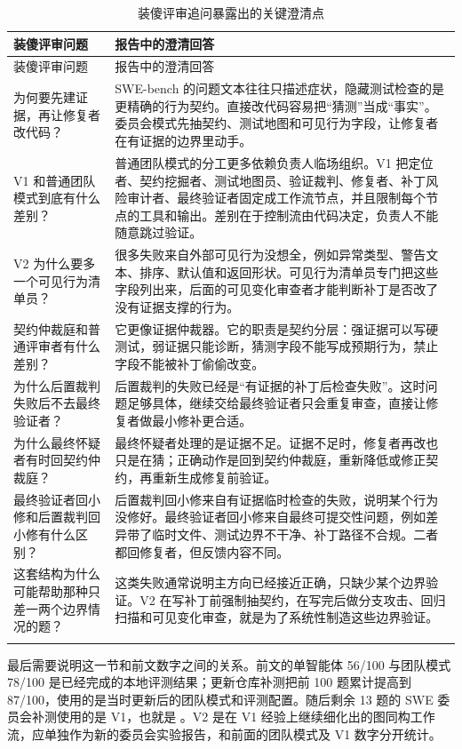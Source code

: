 \documentclass[UTF8,a4paper,11pt]{ctexart}
\begin{document}
\begin{center}
{\small
\setlength{\tabcolsep}{3pt}
\begin{longtable}{L{4.2cm} L{10.1cm}}
\toprule
装傻评审问题 & 报告中的澄清回答 \\
\midrule
\endfirsthead
\toprule
装傻评审问题 & 报告中的澄清回答 \\
\midrule
\endhead
为何要先建证据，再让修复者改代码？ & SWE-bench 的问题文本往往只描述症状，隐藏测试检查的是更精确的行为契约。直接改代码容易把“猜测”当成“事实”。委员会模式先抽契约、测试地图和可见行为字段，让修复者在有证据的边界里动手。 \\
V1 和普通团队模式到底有什么差别？ & 普通团队模式的分工更多依赖负责人临场组织。V1 把定位者、契约挖掘者、测试地图员、验证裁判、修复者、补丁风险审计者、最终验证者固定成工作流节点，并且限制每个节点的工具和输出。差别在于控制流由代码决定，负责人不能随意跳过验证。 \\
V2 为什么要多一个可见行为清单员？ & 很多失败来自外部可见行为没想全，例如异常类型、警告文本、排序、默认值和返回形状。可见行为清单员专门把这些字段列出来，后面的可见变化审查者才能判断补丁是否改了没有证据支撑的行为。 \\
契约仲裁庭和普通评审者有什么差别？ & 它更像证据仲裁器。它的职责是契约分层：强证据可以写硬测试，弱证据只能诊断，猜测字段不能写成预期行为，禁止字段不能被补丁偷偷改变。 \\
为什么后置裁判失败后不去最终验证者？ & 后置裁判的失败已经是“有证据的补丁后检查失败”。这时问题足够具体，继续交给最终验证者只会重复审查，直接让修复者做最小修补更合适。 \\
为什么最终怀疑者有时回契约仲裁庭？ & 最终怀疑者处理的是证据不足。证据不足时，修复者再改也只是在猜；正确动作是回到契约仲裁庭，重新降低或修正契约，再重新生成修复前验证。 \\
最终验证者回小修和后置裁判回小修有什么区别？ & 后置裁判回小修来自有证据临时检查的失败，说明某个行为没修好。最终验证者回小修来自最终可提交性问题，例如差异带了临时文件、测试边界不干净、补丁路径不合规。二者都回修复者，但反馈内容不同。 \\
这套结构为什么可能帮助那种只差一两个边界情况的题？ & 这类失败通常说明主方向已经接近正确，只缺少某个边界验证。V2 在写补丁前强制抽契约，在写完后做分支攻击、回归扫描和可见变化审查，就是为了系统性制造这些边界验证。 \\
\bottomrule
\caption{装傻评审追问暴露出的关键澄清点}
\end{longtable}
}
\end{center}

最后需要说明这一节和前文数字之间的关系。前文的单智能体 56/100 与团队模式 78/100 是已经完成的本地评测结果；更新仓库补测把前 100 题累计提高到 87/100，使用的是当时更新后的团队模式和评测配置。随后剩余 13 题的 SWE 委员会补测使用的是 V1，也就是 。V2 是在 V1 经验上继续细化出的图同构工作流，应单独作为新的委员会实验报告，和前面的团队模式及 V1 数字分开统计。
\end{document}
